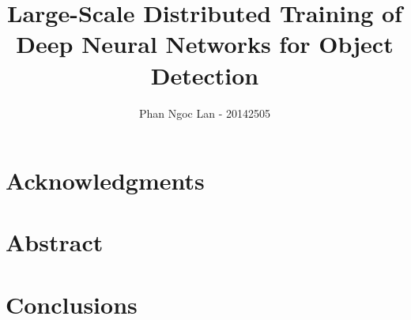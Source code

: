 \documentclass[fontsize=12pt]{scrartcl}
\title{Large-Scale Distributed Training of Deep Neural Networks for Object Detection}
\author{Phan Ngoc Lan - 20142505}
\begin{document}
\maketitle
\pagebreak

\section*{Acknowledgments}

\pagebreak

\section*{Abstract}

\pagebreak

\tableofcontents
\pagebreak






\section{Conclusions}

\pagebreak


\end{document}
